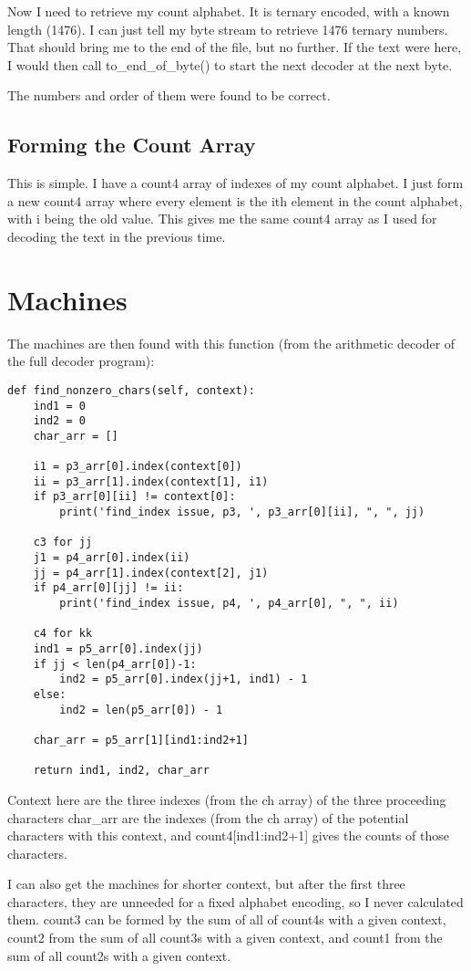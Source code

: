 \documentclass{article}
\begin{document}
Now I need to retrieve my count alphabet. It is ternary encoded, with a known length (1476). I can just tell my byte stream to retrieve 1476 ternary numbers. That should bring me to the end of the file, but no further. If the text were here, I would then call to\_end\_of\_byte() to start the next decoder at the next byte. 

The numbers and order of them were found to be correct.

\subsection{Forming the Count Array}

This is simple. I have a count4 array of indexes of my count alphabet. I just form a new count4 array where every element is the ith element in the count alphabet, with i being the old value. This gives me the same count4 array as I used for decoding the text in the previous time. 

\section{Machines}
The machines are then found with this function (from the arithmetic decoder of the full decoder program):

\lstset{language=Python}

\begin{lstlisting}
def find_nonzero_chars(self, context):
    ind1 = 0
    ind2 = 0
    char_arr = []

    i1 = p3_arr[0].index(context[0])
    ii = p3_arr[1].index(context[1], i1)
    if p3_arr[0][ii] != context[0]:
        print('find_index issue, p3, ', p3_arr[0][ii], ", ", jj)

    c3 for jj
    j1 = p4_arr[0].index(ii)
    jj = p4_arr[1].index(context[2], j1)
    if p4_arr[0][jj] != ii:
        print('find_index issue, p4, ', p4_arr[0], ", ", ii)
    
    c4 for kk
    ind1 = p5_arr[0].index(jj)
    if jj < len(p4_arr[0])-1:
        ind2 = p5_arr[0].index(jj+1, ind1) - 1
    else:
        ind2 = len(p5_arr[0]) - 1

    char_arr = p5_arr[1][ind1:ind2+1]

    return ind1, ind2, char_arr
\end{lstlisting}

Context here are the three indexes (from the ch array) of the three proceeding characters 
char\_arr are the indexes (from the ch array) of the potential characters with this context, and count4[ind1:ind2+1] gives the counts of those characters.

I can also get the machines for shorter context, but after the first three characters, they are unneeded for a fixed alphabet encoding, so I never calculated them. count3 can be formed by the sum of all of count4s with a given context, count2 from the sum of all count3s with a given context, and count1 from the sum of all count2s with a given context. 
\end{document}
